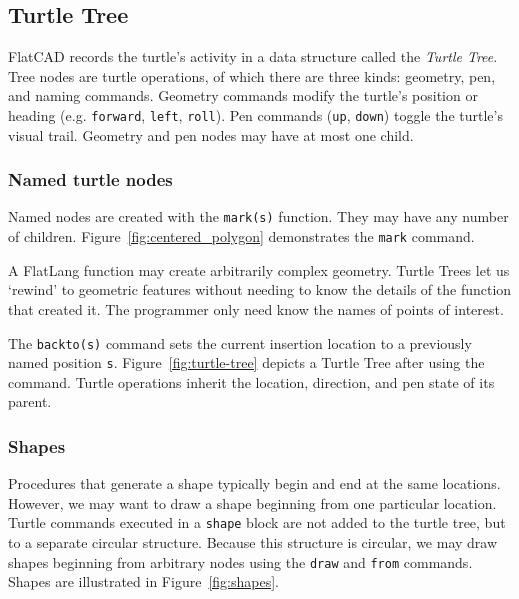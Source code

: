 \documentclass[times, 10pt,twocolumn]{article}
\begin{document}
\subsection{Turtle Tree}

\nohyphens{FlatCAD} records the turtle's activity in a data structure
called the \textit{Turtle Tree}. Tree nodes are turtle operations, of
which there are three kinds: geometry, pen, and naming commands.
Geometry commands modify the turtle's position or heading
(e.g. \textnhtt{forward}, \textnhtt{left}, \textnhtt{roll}). Pen
commands (\textnhtt{up}, \textnhtt{down}) toggle the turtle's visual
trail. Geometry and pen nodes may have at most one child.

\subsubsection{Named turtle nodes}

Named nodes are created with the \textnhtt{mark(s)} function. They may
have any number of children. Figure~\ref{fig:centered_polygon}
demonstrates the \textnhtt{mark} command.

A FlatLang function may create arbitrarily complex geometry. Turtle
Trees let us `rewind' to geometric features without needing to know
the details of the function that created it. The programmer only need
know the names of points of interest. 

The \textnhtt{backto(s)} command sets the current insertion location
to a previously named position
\textnhtt{s}. Figure~\ref{fig:turtle-tree} depicts a Turtle Tree after
using the  command. Turtle operations inherit the
location, direction, and pen state of its parent.

\subsubsection{Shapes}

Procedures that generate a shape typically begin and end at the same
locations. However, we may want to draw a shape beginning from one
particular location. Turtle commands executed in a \textnhtt{shape}
block are not added to the turtle tree, but to a separate circular
structure. Because this structure is circular, we may draw shapes
beginning from arbitrary nodes using the \textnhtt{draw} and
\textnhtt{from} commands. Shapes are illustrated in
Figure~\ref{fig:shapes}.
\end{document}
